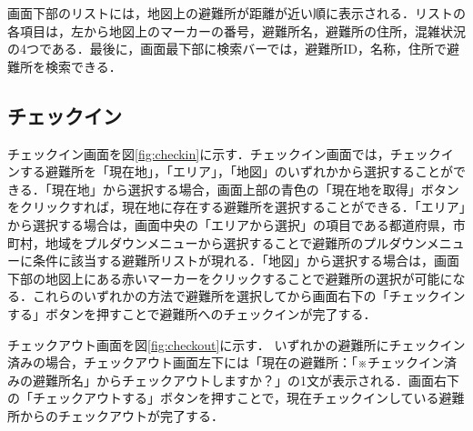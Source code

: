 \documentclass[technicalreport,dvipdfmx]{ieicej}
\begin{document}
画面下部のリストには，地図上の避難所が距離が近い順に表示される．リストの各項目は，左から地図上のマーカーの番号，避難所名，避難所の住所，混雑状況の4つである．最後に，画面最下部に検索バーでは，避難所ID，名称，住所で避難所を検索できる．


\subsection{チェックイン}
チェックイン画面を図\ref{fig:checkin}に示す．チェックイン画面では，チェックインする避難所を「現在地」，「エリア」，「地図」のいずれかから選択することができる．「現在地」から選択する場合，画面上部の青色の「現在地を取得」ボタンをクリックすれば，現在地に存在する避難所を選択することができる．「エリア」から選択する場合は，画面中央の「エリアから選択」の項目である都道府県，市町村，地域をプルダウンメニューから選択することで避難所のプルダウンメニューに条件に該当する避難所リストが現れる．「地図」から選択する場合は，画面下部の地図上にある赤いマーカーをクリックすることで避難所の選択が可能になる．これらのいずれかの方法で避難所を選択してから画面右下の「チェックインする」ボタンを押すことで避難所へのチェックインが完了する．

チェックアウト画面を図\ref{fig:checkout}に示す．
いずれかの避難所にチェックイン済みの場合，チェックアウト画面左下には「現在の避難所：「※チェックイン済みの避難所名」からチェックアウトしますか？」の1文が表示される．画面右下の「チェックアウトする」ボタンを押すことで，現在チェックインしている避難所からのチェックアウトが完了する．
\end{document}
